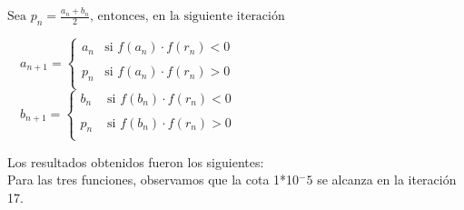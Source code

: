 \documentclass[titlepage,a4paper]{article}
\begin{document}
\smallskip

$\mbox{Sea }p_n = \frac{a_n+b_n}{2}\mbox{, entonces, en la siguiente iteración}$
\begin{center}
    $
    \quad a_{n+1} =\left\{ \begin{array}{lcc}
                 a_n & \mbox{si } f(a_n)\cdot f(r_n) <0 \\
                 \\ p_n & \mbox{si } f(a_n)\cdot f(r_n) > 0 \\
                 \end{array}
       \right. 
    $
    $
    \quad b_{n+1} =\left\{ \begin{array}{lcc}
                 b_n & \mbox{ si } f(b_n)\cdot f(r_n) < 0 \\
                 \\p_n & \mbox{ si } f(b_n)\cdot f(r_n) > 0 \\
                 \end{array}
       \right.
    $
\end{center}
\smallskip
Los resultados obtenidos fueron los siguientes:
\\Para las tres funciones, observamos que la cota 1*10$^-5$ se alcanza en la iteración 17.
\end{document}
